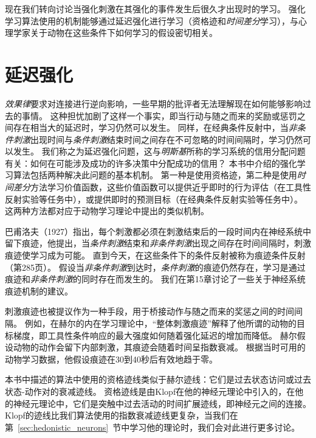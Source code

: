 现在我们转向讨论当强化刺激在其强化的事件发生后很久才出现时的学习。
强化学习算法使用的机制能够通过延迟强化进行学习（资格迹和\textit{时间差分}学习），与心理学家关于动物在这些条件下如何学习的假设密切相关。


\section{延迟强化} \label{sec:delayed_reinforcement}


\textit{效果律}要求对连接进行逆向影响，一些早期的批评者无法理解现在如何能够影响过去的事情。
这种担忧加剧了这样一个事实，即当行动与随之而来的奖励或惩罚之间存在相当大的延迟时，学习仍然可以发生。
同样，在经典条件反射中，当\textit{非条件刺激}出现时间与\textit{条件刺激}结束时间之间存在不可忽略的时间间隔时，学习仍然可以发生。
我们称之为延迟强化问题，这与\textit{明斯基}\cite{minsky1961steps}所称的学习系统的信用分配问题有关：如何在可能涉及成功的许多决策中分配成功的信用？
本书中介绍的强化学习算法包括两种解决此问题的基本机制。
第一种是使用资格迹，第二种是使用\textit{时间差分}方法学习价值函数，这些价值函数可以提供近乎即时的行为评估（在工具性反射实验等任务中），或提供即时的预测目标（在经典条件反射实验等任务中）。
这两种方法都对应于动物学习理论中提出的类似机制。


巴甫洛夫（1927）指出，每个刺激都必须在刺激结束后的一段时间内在神经系统中留下痕迹，他提出，当\textit{条件刺激}结束和\textit{非条件刺激}出现之间存在时间间隔时，刺激痕迹使学习成为可能。
直到今天，在这些条件下的条件反射被称为痕迹条件反射（第285页）。
假设当\textit{非条件刺激}到达时，\textit{条件刺激}的痕迹仍然存在，学习是通过痕迹和\textit{非条件刺激}的同时存在而发生的。
我们在第15章讨论了一些关于神经系统痕迹机制的建议。


刺激痕迹也被提议作为一种手段，用于桥接动作与随之而来的奖惩之间的时间间隔。
例如，在赫尔的内在学习理论中，“整体刺激痕迹”解释了他所谓的动物的目标梯度，即工具性条件响应的最大强度如何随着强化延迟的增加而降低\cite{hull1932goal,hull1943principles}。
赫尔假设动物的动作会留下内部刺激，其痕迹会随着时间呈指数衰减。
根据当时可用的动物学习数据，他假设痕迹在30到40秒后有效地趋于零。




本书中描述的算法中使用的资格迹线类似于赫尔迹线：它们是过去状态访问或过去状态-动作对的衰减迹线。
资格迹线是由Klopf\cite{klopf1972brain}在他的神经元理论中引入的，在他的神经元理论中，它们是突触中过去活动的时间扩展迹线，即神经元之间的连接。
Klopf的迹线比我们算法使用的指数衰减迹线更复杂，当我们在第~\ref{sec:hedonistic_neurons}~节中学习他的理论时，我们会对此进行更多讨论。


